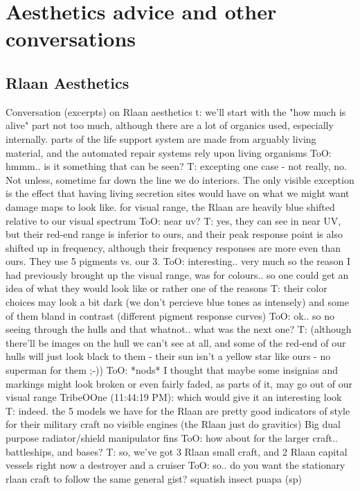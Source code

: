 \section{Aesthetics advice and other conversations}
\subsection{Rlaan Aesthetics}

Conversation (excerpts) on Rlaan aesthetics
t: we'll start with the "how much is alive" part
not too much, although there are a lot of organics used, especially internally.
parts of the life support system are made from arguably living material, and the automated repair systems rely upon living organisms
ToO: hmmm.. is it something that can be seen?
T: excepting one case - not really, no. Not unless, sometime far down the line we do interiors. The only visible exception is the effect that having living secretion sites would have on what we might want damage maps to look like.
for visual range, the Rlaan are heavily blue shifted relative to our visual spectrum
ToO: near uv?
T: yes, they can see in near UV, but their red-end range is inferior to ours, and their peak response point is also shifted up in frequency, although their frequency responses are more even than ours. They use 5 pigments vs. our 3.
ToO: interesting.. very much so
the reason I had previously brought up the visual range, was for colours.. so one could get an idea of what they would look like
or rather one of the reasons
T: their color choices may look a bit dark (we don't percieve blue tones as intensely) and some of them bland in contrast (different pigment response curves)
ToO: ok.. so no seeing through the hulls and that whatnot.. what was the next one?
T: (although there'll be images on the hull we can't see at all, and some of the red-end of our hulls will just look black to them - their sun isn't a yellow star like ours - no superman for them ;-))
ToO: *nods* I thought that maybe some insignias and markings might look broken or even fairly faded, as parts of it, may go out of our visual range
TribeOOne (11:44:19 PM): which would give it an interesting look
T: indeed.
the 5 models we have for the Rlaan are pretty good indicators of style for their military craft
 no visible engines (the Rlaan just do gravitics)
 Big dual purpose radiator/shield manipulator fins
ToO: how about for the larger craft.. battleships, and bases?
T: so, we've got 3 Rlaan small craft, and 2 Rlaan capital vessels right now
 a destroyer and a cruiser
ToO: so.. do you want the stationary rlaan craft to follow the same general gist? squatish insect puapa (sp) 
